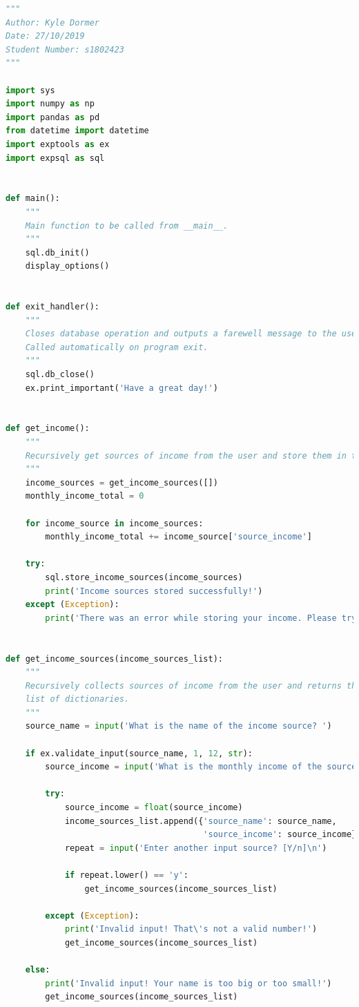 \documentclass[11pt]{article}
\begin{document}
  \begin{lstlisting}[language=Python, caption=Source code for \textit{expcli.py}.]
    """
Author: Kyle Dormer
Date: 27/10/2019
Student Number: s1802423
"""

import sys
import numpy as np
import pandas as pd
from datetime import datetime
import exptools as ex
import expsql as sql


def main():
    """
    Main function to be called from __main__. 
    """
    sql.db_init()
    display_options()


def exit_handler():
    """
    Closes database operation and outputs a farewell message to the user.
    Called automatically on program exit.
    """
    sql.db_close()
    ex.print_important('Have a great day!')


def get_income():
    """
    Recursively get sources of income from the user and store them in the database.
    """
    income_sources = get_income_sources([])
    monthly_income_total = 0

    for income_source in income_sources:
        monthly_income_total += income_source['source_income']

    try:
        sql.store_income_sources(income_sources)
        print('Income sources stored successfully!')
    except (Exception):
        print('There was an error while storing your income. Please try again!')


def get_income_sources(income_sources_list):
    """
    Recursively collects sources of income from the user and returns them in a
    list of dictionaries.
    """
    source_name = input('What is the name of the income source? ')

    if ex.validate_input(source_name, 1, 12, str):
        source_income = input('What is the monthly income of the source? ')

        try:
            source_income = float(source_income)
            income_sources_list.append({'source_name': source_name,
                                        'source_income': source_income})
            repeat = input('Enter another input source? [Y/n]\n')

            if repeat.lower() == 'y':
                get_income_sources(income_sources_list)

        except (Exception):
            print('Invalid input! That\'s not a valid number!')
            get_income_sources(income_sources_list)

    else:
        print('Invalid input! Your name is too big or too small!')
        get_income_sources(income_sources_list)


\end{lstlisting}
\end{document}
